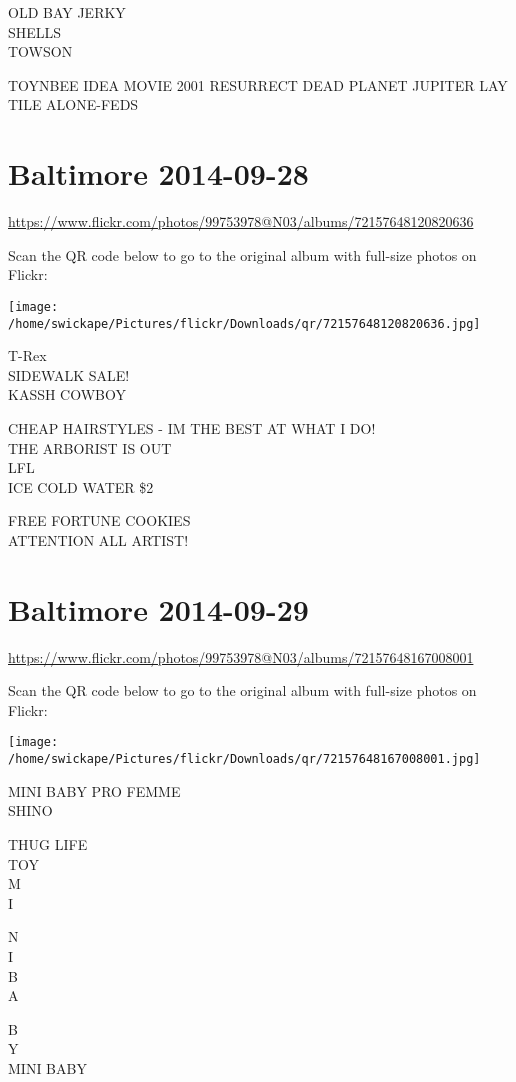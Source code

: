 \documentclass[10pt,letterpaper]{article}
\begin{document}
OLD BAY JERKY\\
SHELLS\\
TOWSON

TOYNBEE IDEA MOVIE 2001 RESURRECT DEAD PLANET JUPITER LAY TILE ALONE{-}FEDS


\section*{Baltimore 2014-09-28}

\url{https://www.flickr.com/photos/99753978@N03/albums/72157648120820636}

Scan the QR code below to go to the original album with full-size photos on Flickr:

\texttt{[image: /home/swickape/Pictures/flickr/Downloads/qr/72157648120820636.jpg]}


T{-}Rex\\
SIDEWALK SALE!\\
KASSH COWBOY

CHEAP HAIRSTYLES {-} IM THE BEST AT WHAT I DO!\\
THE ARBORIST IS OUT\\
LFL\\
ICE COLD WATER \$2

FREE FORTUNE COOKIES\\
ATTENTION ALL ARTIST!


\section*{Baltimore 2014-09-29}

\url{https://www.flickr.com/photos/99753978@N03/albums/72157648167008001}

Scan the QR code below to go to the original album with full-size photos on Flickr:

\texttt{[image: /home/swickape/Pictures/flickr/Downloads/qr/72157648167008001.jpg]}


MINI BABY PRO FEMME\\
SHINO

THUG LIFE\\
TOY\\
M\\
I

N\\
I\\
B\\
A

B\\
Y\\
MINI BABY
\end{document}
